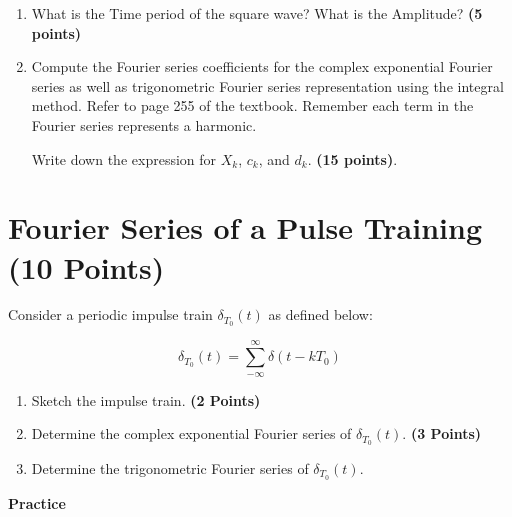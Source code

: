 \documentclass[12pt, xcolor=dvipsnames,svgnames,x11names]{article}
\begin{document}
\begin{enumerate}
    \item What is the Time period of the square wave? What is the Amplitude? \hfill \textbf{(5 points)}
    \item Compute the Fourier series coefficients for the complex exponential Fourier series as well as trigonometric Fourier series representation using the integral method. Refer to page 255 of the textbook. Remember each term in the Fourier series represents a harmonic.

Write down the expression for $X_k$, $c_k$, and $d_k$. \hfill \textbf{(15 points)}.
 
\end{enumerate}



\section{Fourier Series of a Pulse Training (10 Points)}
Consider a periodic impulse train $\delta_{T_0}(t)$ as defined below:

$$
\delta_{T_0}(t)  =\sum_{-\infty}^\infty \delta(t -k T_0)
$$

\begin{enumerate}
\item Sketch the impulse train. \hfill \textbf{(2 Points)}

\item Determine the complex exponential Fourier series of $\delta_{T_0}(t) $. \textbf{(3 Points)}

\item Determine the trigonometric Fourier series of $\delta_{T_0}(t) $.
\end{enumerate}


\bigskip

\bigskip

{{\LARGE \textbf{Practice}}}
\end{document}
